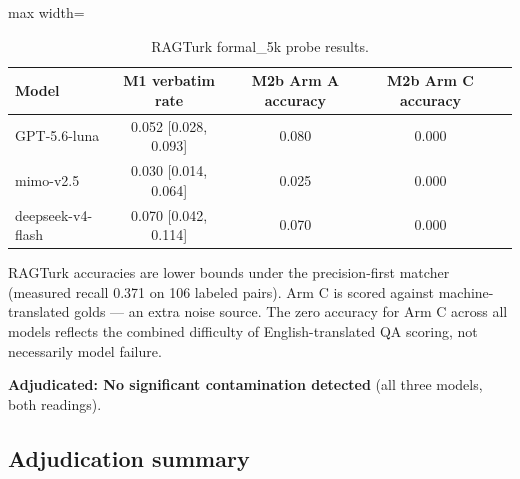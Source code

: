\documentclass[11pt]{article}
\begin{document}
\begin{table}[t]
\centering
\begin{adjustbox}{max width=\textwidth}
\begin{tabular}{lcccc}
\toprule
\textbf{Model} & \textbf{M1 verbatim rate} & \textbf{M2b Arm A accuracy} & \textbf{M2b Arm C accuracy} \\
\midrule
GPT-5.6-luna & 0.052 [0.028, 0.093] & 0.080 & 0.000 \\
mimo-v2.5 & 0.030 [0.014, 0.064] & 0.025 & 0.000 \\
deepseek-v4-flash & 0.070 [0.042, 0.114] & 0.070 & 0.000 \\
\bottomrule
\end{tabular}%
\end{adjustbox}
\caption{RAGTurk formal\_5k probe results.}
\label{tab:ragturk}
\end{table}

RAGTurk accuracies are lower bounds under the precision-first matcher (measured recall 0.371 on 106 labeled pairs). Arm C is scored against machine-translated golds --- an extra noise source. The zero accuracy for Arm C across all models reflects the combined difficulty of English-translated QA scoring, not necessarily model failure.

\textbf{Adjudicated: No significant contamination detected} (all three models, both readings).

\subsection{Adjudication summary}
\end{document}
